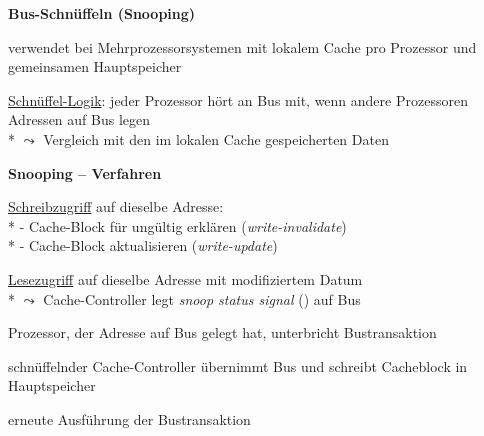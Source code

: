 \textbf{Bus-Schnüffeln (Snooping)}
\begin{items}
	\item verwendet bei Mehrprozessorsystemen mit lokalem Cache pro Prozessor und gemeinsamen Hauptspeicher
	\item \underline{Schnüffel-Logik}: jeder Prozessor hört an Bus mit, wenn andere Prozessoren Adressen auf Bus legen \\* \( \leadsto \) Vergleich mit den im lokalen Cache gespeicherten Daten
\end{items}

\textbf{Snooping -- Verfahren}
\begin{items}
	\item \underline{Schreibzugriff} auf dieselbe Adresse: \\*
		- Cache-Block für ungültig erklären (\emph{write-invalidate}) \\*
		- Cache-Block aktualisieren (\emph{write-update})
	\item \underline{Lesezugriff} auf dieselbe Adresse mit modifiziertem Datum \\*
		\( \leadsto \) Cache-Controller legt \emph{snoop status signal} () auf Bus
	\begin{enumeration}
		\item Prozessor, der Adresse auf Bus gelegt hat, unterbricht Bustransaktion
		\item schnüffelnder Cache-Controller übernimmt Bus und schreibt Cacheblock in Hauptspeicher
		\item erneute Ausführung der Bustransaktion
	\end{enumeration}
\end{items}